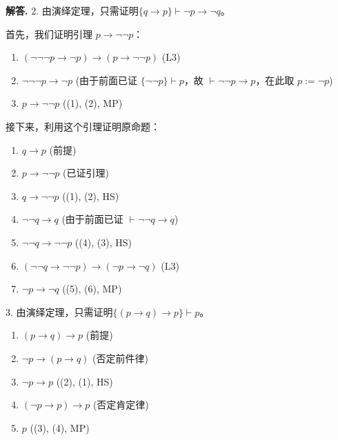 \documentclass[12pt, a4paper, oneside]{ctexart}
\newenvironment{solution}{\par\noindent\textbf{解答. }}{\par}
\begin{document}
\begin{solution}
    2. 由演绎定理，只需证明$\{ q \to p\} \vdash \lnot p \to \lnot q$。

    首先，我们证明引理 $p \to \lnot\lnot p$：
    \begin{enumerate}
        \item[(1)] $(\lnot\lnot\lnot p \to \lnot p) \to (p \to \lnot\lnot p)$ \hfill (L3)
        \item[(2)] $\lnot\lnot\lnot p \to \lnot p$ \hfill (由于前面已证 $\{ \lnot\lnot p\} \vdash p$，故 $\vdash \lnot\lnot p \to p$，在此取 $p := \lnot p$)
        \item[(3)] $p \to \lnot\lnot p$ \hfill ((1), (2), MP)
    \end{enumerate}
    接下来，利用这个引理证明原命题：
    \begin{enumerate}
        \item[(1)] $q \to p$ \hfill (前提)
        \item[(2)] $p \to \lnot\lnot p$ \hfill (已证引理)
        \item[(3)] $q \to \lnot\lnot p$ \hfill ((1), (2), HS)
        \item[(4)] $\lnot\lnot q \to q$ \hfill (由于前面已证 $\vdash \lnot\lnot q \to q$)
        \item[(5)] $\lnot\lnot q \to \lnot\lnot p$ \hfill ((4), (3), HS)
        \item[(6)] $(\lnot\lnot q \to \lnot\lnot p) \to (\lnot p \to \lnot q)$ \hfill (L3)
        \item[(7)] $\lnot p \to \lnot q$ \hfill ((5), (6), MP)
    \end{enumerate}

    3. 由演绎定理，只需证明$\{ (p \to q) \to p \} \vdash p$。
    \begin{enumerate}
        \item[(1)] $(p \to q) \to p$ \hfill (前提)
        \item[(2)] $\lnot p \to (p \to q)$ \hfill (否定前件律)
        \item[(3)] $\lnot p \to p$ \hfill ((2), (1), HS)
        \item[(4)] $(\lnot p \to p) \to p$ \hfill (否定肯定律)
        \item[(5)] $p$ \hfill ((3), (4), MP)
    \end{enumerate}

\end{solution}
\end{document}
